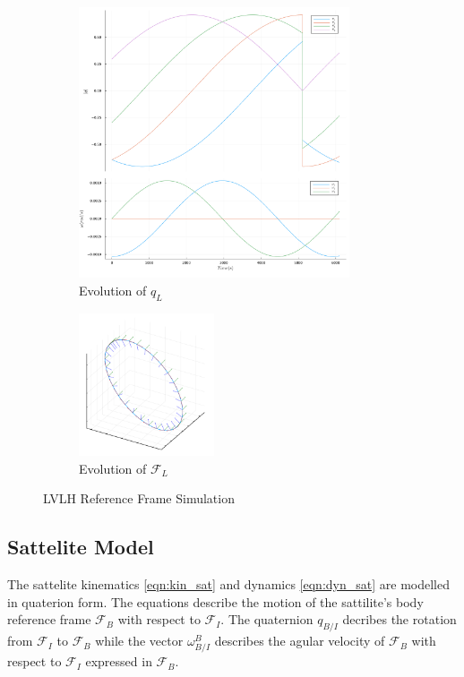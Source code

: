 \documentclass{article}
\begin{document}
\begin{figure}[H]
\centering
	\begin{subfigure}[b]{0.6\textwidth}
		\centering
		\includegraphics[width=8cm]{images/lvlh_attitude.png}
		\caption{Evolution of $q_{L}$}
		\label{fig:quat_lvlh}
	\end{subfigure}
	\begin{subfigure}[b]{0.3\textwidth}
		\centering
		\includegraphics[width=4cm]{images/lvlh_orbit_0s_to_6100s.png}
		\caption{Evolution of $\mathcal{F}_{L}$}
		\label{fig:orbit_lvlh}
	\end{subfigure}
	\caption{LVLH Reference Frame Simulation}
\end{figure}

\subsection{Sattelite Model}

The sattelite kinematics \ref{eqn:kin_sat} and dynamics \ref{eqn:dyn_sat} are modelled in quaterion form. The equations describe the motion of the sattilite's body reference frame $\mathcal{F}_B$ with respect to $\mathcal{F}_I$. The quaternion $q_{B/I}$ decribes the rotation from $\mathcal{F}_I$ to $\mathcal{F}_B$ while the vector $\omega_{B/I}^B$ describes the agular velocity of $\mathcal{F}_B$ with respect to $\mathcal{F}_I$ expressed in $\mathcal{F}_B$. 
\end{document}
